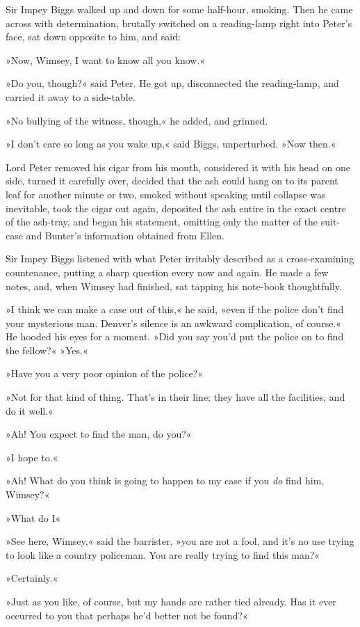 Sir Impey Biggs walked up and down for some half-hour, smoking. Then he came across with determination, brutally switched on a reading-lamp right into Peter's face, sat down opposite to him, and said:

»Now, Wimsey, I want to know all you know.«

»Do you, though?« said Peter. He got up, disconnected the reading-lamp, and carried it away to a side-table.

»No bullying of the witness, though,« he added, and grinned.

»I don't care so long as you wake up,« said Biggs, unperturbed. »Now then.«

Lord Peter removed his cigar from his mouth, considered it with his head on one side, turned it carefully over, decided that the ash could hang on to its parent leaf for another minute or two, smoked without speaking until collapse was inevitable, took the cigar out again, deposited the ash entire in the exact centre of the ash-tray, and began his statement, omitting only the matter of the suit-case and Bunter's information obtained from Ellen.

Sir Impey Biggs listened with what Peter irritably described as a cross-examining countenance, putting a sharp question every now and again. He made a few notes, and, when Wimsey had finished, sat tapping his note-book thoughtfully.

»I think we can make a case out of this,« he said, »even if the police don't find your mysterious man. Denver's silence is an awkward complication, of course.« He hooded his eyes for a moment. »Did you say you'd put the police on to find the fellow?«
»Yes.«

»Have you a very poor opinion of the police?«

»Not for that kind of thing. That's in their line; they have all the facilities, and do it well.«

»Ah! You expect to find the man, do you?«

»I hope to.«

»Ah! What do you think is going to happen to my case if you \textit{do} find him, Wimsey?«

»What do I\longdash«

»See here, Wimsey,« said the barrister, »you are not a fool, and it's no use trying to look like a country policeman. You are really trying to find this man?«

»Certainly.«

»Just as you like, of course, but my hands are rather tied already. Has it ever occurred to you that perhaps he'd better not be found?«

